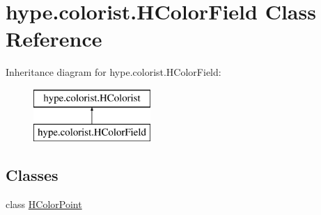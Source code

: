 \hypertarget{classhype_1_1colorist_1_1_h_color_field}{\section{hype.\-colorist.\-H\-Color\-Field Class Reference}
\label{classhype_1_1colorist_1_1_h_color_field}
}
Inheritance diagram for hype.\-colorist.\-H\-Color\-Field\-:\begin{figure}[H]
\begin{center}
\leavevmode
\includegraphics[height=2.000000cm]{classhype_1_1colorist_1_1_h_color_field}
\end{center}
\end{figure}
\subsection*{Classes}
\begin{DoxyCompactItemize}
\item 
class \hyperlink{classhype_1_1colorist_1_1_h_color_field_1_1_h_color_point}{H\-Color\-Point}
\end{DoxyCompactItemize}
